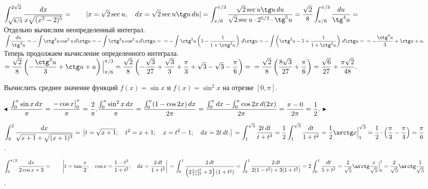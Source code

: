 \documentclass[a5paper,10pt]{article}
\begin{document}
\medskip
{} $\displaystyle \int_{\sqrt{8/3}}^{2\sqrt2}\frac{dx}{x\sqrt{(x^2-2)^5}}=\qquad
|x=\sqrt2\sec u,\quad dx=\sqrt2\sec u \tg u\,du|\\
=\int_{\pi/6}^{\pi/3}\frac{\sqrt2\sec u \tg u\,du}{\sqrt2\sec u\cdot 2^{5/2}\cdot \tg^5 u}=
\frac{\sqrt2}{8}\int_{\pi/6}^{\pi/3}\frac{du}{\tg^4u}=$\\
Отдельно вычислим неопределенный интеграл.\\
$\displaystyle \int\frac{du}{\tg^4u}=-\int\ctg^2u\cos^2u\,d\ctg u=
-\int\ctg^2u\cos^2u\,d\ctg u=\\
=-\int\ctg^2u\left(1-\frac{1}{1+\ctg^2u}\right)\,d\ctg u=
-\int\left(\ctg^2u-1+\frac{1}{1+\ctg^2u}\right)\,d\ctg u=\\
=-\frac{\ctg^3u}{3}+\ctg u+u.$\\
Теперь продолжаем вычисление определенного интеграла.\\
$\displaystyle =\frac{\sqrt2}{8}\left(-\frac{\ctg^3u}{3}+\ctg u+u\right)\Big|_{\pi/6}^{\pi/3}=
\frac{\sqrt2}{8}\left(-\frac{\sqrt3}{27}+\frac{\sqrt3}{3}+\frac{\pi}{3}+\sqrt3-\sqrt3-\frac{\pi}{6}\right)=\\
=\frac{\sqrt2}{8}\left(\frac{8\sqrt3}{27}+\frac{\pi}{6}\right)=\frac{\sqrt6}{27}+\frac{\pi\sqrt2}{48}.$

\medskip
{} Вычислить среднее значение функций $f(x)=\sin x$ и
$f(x)=\sin^2x$ на отрезке $[0,\pi]$.

\smallskip
\noindent $\blacktriangleleft$ $\displaystyle \frac{\int_0^{\pi}\sin x\,dx}{\pi}=
\frac{-\cos x\big|_0^{\pi}}{\pi}=\frac {2}{\pi}.\\
\frac{\int_0^{\pi}\sin^2 x\,dx}{\pi}=\frac{\int_0^{\pi}(1-\cos 2x)\,dx}{2\pi}=
\frac{\int_0^{\pi}dx-\int_0^{\pi}\cos 2x\,d(2x)}{2\pi}=\frac{\pi-0}{2\pi}=\frac12.$
$\blacktriangleright$

\medskip
{} $\displaystyle \int_0^2\frac{dx}{\sqrt{x+1}+\sqrt{(x+1)^3}}=\\
\left|t=\sqrt{x+1};\quad t^2=x+1;\quad x=t^2-1;\quad dx=2t\,dt.\right|\\
=\int_1^{\sqrt3}\frac{2t\,dt}{t+t^3}=\frac12\int_1^{\sqrt3}\frac{dt}{1+t^2}=
\frac12\arctg x\Big|_1^{\sqrt3}=\frac12\cdot\left(\frac{\pi}{3}-\frac{\pi}{4}\right)=
\frac{\pi}{6}$.

\medskip
{} $\displaystyle \int_0^{\pi/2}\frac{dx}{2\cos x+3}=\qquad
\left|t=\tan\frac x2;\quad\cos x=\frac{1-t^2}{1+t^2};\quad dx=\frac{2\,dt}{1+t^2}\right|\\
=\int_0^1\frac{2\,dt}{\left(2\frac{1-t^2}{1+t^2}+3\right)(1+t^2)}=
\int_0^1\frac{2\,dt}{2(1-t^2)+3(1+t^2)}=2\int_0^1\frac{dt}{5+t^2}=\\
\frac{2}{\sqrt5}\arctg\frac{x}{\sqrt5}\Big|_0^1=
\frac{2}{\sqrt5}\arctg\frac{1}{\sqrt5}$.
\end{document}
